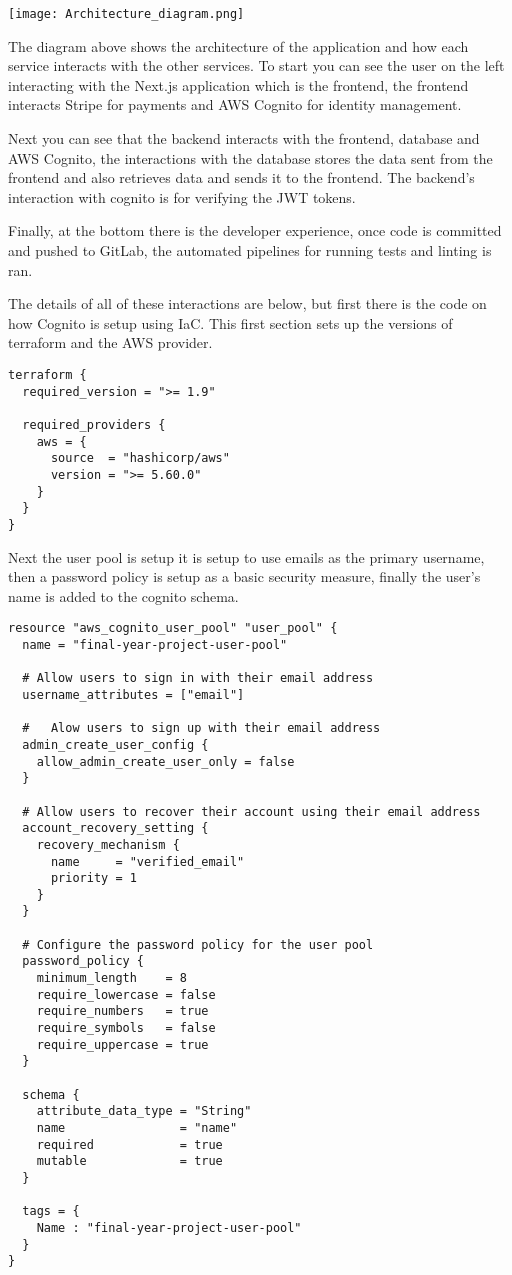 \documentclass[]{project_report}
\begin{document}
\texttt{[image: Architecture\_diagram.png]}

The diagram above shows the architecture of the application and how each service interacts with the other services. To start you can see the user on the left interacting with the Next.js application which is the frontend, the frontend interacts Stripe for payments and AWS Cognito for identity management.

Next you can see that the backend interacts with the frontend, database and AWS Cognito, the interactions with the database stores the data sent from the frontend and also retrieves data and sends it to the frontend. The backend's interaction with cognito is for verifying the JWT tokens. 

Finally, at the bottom there is the developer experience, once code is committed and pushed to GitLab, the automated pipelines for running tests and linting is ran. 

The details of all of these interactions are below, but first there is the code on how Cognito is setup using IaC. This first section sets up the versions of terraform and the AWS provider.

\begin{verbatim}
terraform {
  required_version = ">= 1.9"

  required_providers {
    aws = {
      source  = "hashicorp/aws"
      version = ">= 5.60.0"
    }
  }
}
\end{verbatim}

Next the user pool is setup it is setup to use emails as the primary username, then a password policy is setup as a basic security measure, finally the user's name is added to the cognito schema.

\begin{verbatim}
resource "aws_cognito_user_pool" "user_pool" {
  name = "final-year-project-user-pool"

  # Allow users to sign in with their email address
  username_attributes = ["email"]

  #   Alow users to sign up with their email address
  admin_create_user_config {
    allow_admin_create_user_only = false
  }

  # Allow users to recover their account using their email address
  account_recovery_setting {
    recovery_mechanism {
      name     = "verified_email"
      priority = 1
    }
  }

  # Configure the password policy for the user pool
  password_policy {
    minimum_length    = 8
    require_lowercase = false
    require_numbers   = true
    require_symbols   = false
    require_uppercase = true
  }

  schema {
    attribute_data_type = "String"
    name                = "name"
    required            = true
    mutable             = true
  }
  
  tags = {
    Name : "final-year-project-user-pool"
  }
}

\end{verbatim}
\end{document}
